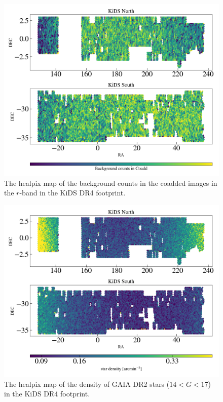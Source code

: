 \documentclass[fleqn,usenatbib,useAMS]{mnras}
\begin{document}
\begin{figure}
\includegraphics[width=\textwidth, height = 0.5\textwidth]{figures_tmp/sys/scatter_BackGr.png}
\caption{\label{fig:scatter_BackGr} The healpix map of the background counts in the coadded images in the $r$-band in the KiDS DR4 footprint.} 
\end{figure}

\begin{figure}
\includegraphics[width=\textwidth, height = 0.5\textwidth]{figures_tmp/sys/scatter_nstar.png}
\caption{\label{fig:scatter_stardens} The healpix map of the density of GAIA DR2 stars ($14<G<17$) in the KiDS DR4 footprint.} 
\end{figure}
\end{document}
